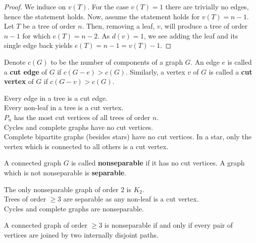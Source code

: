 \begin{proof}
	We induce on $v\left( T \right) $. For the case $v\left( T \right) = 1$ there are trivially no edges, hence the statement holds. Now, assume the statement holds for $v\left( T \right) = n-1$. Let $T$ be a tree of order $n$. Then, removing a leaf, $v$, will produce a tree of order $n-1$ for which $e\left( T \right) = n-2$. As $d\left( v \right) = 1$, we see adding the leaf and its single edge back yields $e\left( T \right)  = n-1 = v\left( T \right) -1$.
\end{proof}
\begin{definition}[Cuts]
	Denote $c\left( G \right) $ to be the number of components of a graph $G$. An edge $e$ is called a  \textbf{cut edge} of $G$ if $c\left( G - e \right) > c\left( G \right) $. Similarly, a vertex $v$ of $G$ is called a \textbf{cut vertex} of $G$ if $c\left( G - v \right) > c\left( G \right) $.
\end{definition}
\begin{example}
	Every edge in a tree is a cut edge.\\
	Every non-leaf in a tree is a cut vertex.\\
	$P_{n}$ has the most cut vertices of all trees of order $n$.\\
	Cycles and complete graphs have no cut vertices.\\
	Complete bipartite graphs (besides stars) have no cut vertices. In a star, only the vertex which is connected to all others is a cut vertex.\\
\end{example}
\begin{definition}[Seperability]
	A connected graph $G$ is called \textbf{nonseparable} if it has no cut vertices. A graph which is not nonseparable is \textbf{separable}.
\end{definition}
\begin{example}
	The only nonseparable graph of order $2$ is $K_2$.\\
	Trees of order $\ge 3$ are separable as any non-leaf is a cut vertex.\\
	Cycles and complete graphs are nonseparable.\\
\end{example}
\begin{theorem}
	A connected graph of order $\ge 3$ is nonseparable if and only if every pair of vertices are joined by two internally disjoint paths.
\end{theorem}
